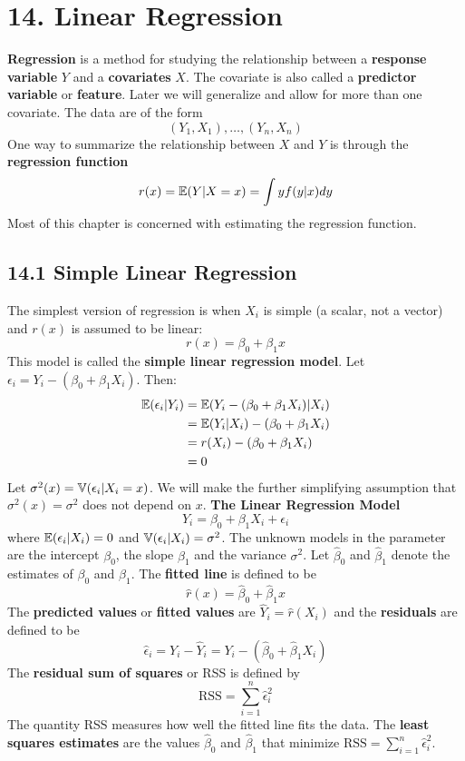 \section*{14. Linear Regression}\label{linear-regression}
\textbf{Regression} is a method for studying the relationship between a
\textbf{response variable} \(Y\) and a \textbf{covariates} \(X\). The
covariate is also called a \textbf{predictor variable} or
\textbf{feature}. Later we will generalize and allow for more than one
covariate. The data are of the form
\[
(Y_{1}, X_{1}), \dots, (Y_{n}, X_{n})
\]
One way to summarize the relationship between \(X\) and \(Y\) is through
the \textbf{regression function}
\[
r(x) = \operatorname{\mathbb{E}}(Y | X = x) = \int y f(y | x) dy
\]
Most of this chapter is concerned with estimating the regression
function.

\subsection*{14.1 Simple Linear
Regression}\label{simple-linear-regression}
The simplest version of regression is when \(X_{i}\) is simple (a scalar,
not a vector) and \(r(x)\) is assumed to be linear:
\[
r(x) = \beta_{0} + \beta_{1} x
\]
This model is called the \textbf{simple linear regression model}. Let
\(\epsilon_{i} = Y_{i} - (\beta_{0} + \beta_{1} X_{i})\). Then:
\begin{align*}
\operatorname{\mathbb{E}}(\epsilon_{i} | Y_{i}) &= \operatorname{\mathbb{E}}(Y_{i} - (\beta_{0} + \beta_{1} X_{i}) | X_{i})\\
&= \operatorname{\mathbb{E}}(Y_{i} | X_{i}) - (\beta_{0} + \beta_{1} X_{i})\\
&= r(X_{i}) - (\beta_{0} + \beta_{1} X_{i})\\
&= 0
\end{align*}
Let \(\sigma^{2}(x) = \operatorname{\mathbb{V}}(\epsilon_{i} | X_{i} = x)\). We will make the
further simplifying assumption that \(\sigma^{2}(x) = \sigma^{2}\) does not
depend on \(x\).
\textbf{The Linear Regression Model}
\[
Y_{i} = \beta_{0} + \beta_{1} X_{i} + \epsilon_{i}
\]
where \(\operatorname{\mathbb{E}}(\epsilon_{i} | X_{i}) = 0\) and
\(\operatorname{\mathbb{V}}(\epsilon_{i} | X_{i}) = \sigma^{2}\).
The unknown models in the parameter are the intercept \(\beta_{0}\), the
slope \(\beta_{1}\) and the variance \(\sigma^{2}\). Let \(\hat{\beta}_{0}\)
and \(\hat{\beta}_{1}\) denote the estimates of \(\beta_{0}\) and
\(\beta_{1}\). The \textbf{fitted line} is defined to be
\[
\hat{r}(x) = \hat{\beta}_{0} + \hat{\beta}_{1} x
\]
The \textbf{predicted values} or \textbf{fitted values} are
\(\hat{Y}_{i} = \hat{r}(X_{i})\) and the \textbf{residuals} are defined to
be
\[
\hat{\epsilon}_{i} = Y_{i} - \hat{Y}_{i} = Y_{i} - (\hat{\beta}_{0} + \hat{\beta}_{1} X_{i})
\]
The \textbf{residual sum of squares} or RSS is defined by
\[
\text{RSS} = \sum_{i=1}^{n} \hat{\epsilon}_{i}^{2}
\]
The quantity RSS measures how well the fitted line fits the data.
The \textbf{least squares estimates} are the values \(\hat{\beta}_{0}\)
and \(\hat{\beta}_{1}\) that minimize
\(\text{RSS} = \sum_{i=1}^{n} \hat{\epsilon}_{i}^{2}\).


